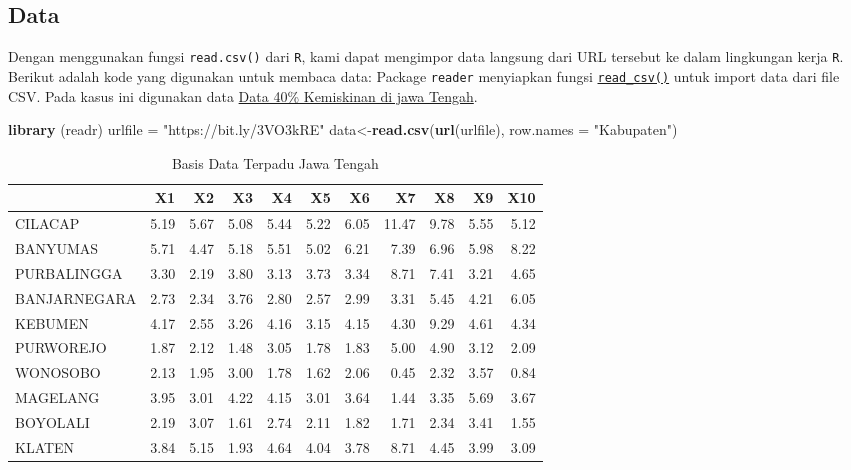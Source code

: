 \documentclass[
  oneside]{book}
\newenvironment{Shaded}{\begin{snugshade}}{\end{snugshade}}
\newcommand{\AttributeTok}[1]{\textcolor[rgb]{0.13,0.29,0.53}{#1}}
\newcommand{\FunctionTok}[1]{\textcolor[rgb]{0.13,0.29,0.53}{\textbf{#1}}}
\newcommand{\NormalTok}[1]{#1}
\newcommand{\OtherTok}[1]{\textcolor[rgb]{0.56,0.35,0.01}{#1}}
\newcommand{\StringTok}[1]{\textcolor[rgb]{0.31,0.60,0.02}{#1}}
\begin{document}
\subsection*{Data}\label{data}

Dengan menggunakan fungsi \texttt{read.csv()} dari \texttt{R}, kami dapat mengimpor data langsung dari URL tersebut ke dalam lingkungan kerja \texttt{R}. Berikut adalah kode yang digunakan untuk membaca data:
Package \texttt{reader} menyiapkan fungsi \href{https://readr.tidyverse.org/reference/read_delim.html}{\texttt{read\_csv()}} untuk import data dari file CSV. Pada kasus ini digunakan data \href{https://github.com/dedenistiawan/Dataset/blob/main/BDT.csv}{Data 40\% Kemiskinan di jawa Tengah}.

\begin{Shaded}
\begin{Highlighting}[]
\FunctionTok{library}\NormalTok{ (readr)}
\NormalTok{urlfile }\OtherTok{=} \StringTok{"https://bit.ly/3VO3kRE"}
\NormalTok{data}\OtherTok{\textless{}{-}}\FunctionTok{read.csv}\NormalTok{(}\FunctionTok{url}\NormalTok{(urlfile), }\AttributeTok{row.names =} \StringTok{"Kabupaten"}\NormalTok{)}
\end{Highlighting}
\end{Shaded}

\begin{table}

\caption{\label{tab:nice-tab-km}Basis Data Terpadu Jawa Tengah}
\centering
\begin{tabular}[t]{lrrrrrrrrrr}
\toprule
  & X1 & X2 & X3 & X4 & X5 & X6 & X7 & X8 & X9 & X10\\
\midrule
CILACAP & 5.19 & 5.67 & 5.08 & 5.44 & 5.22 & 6.05 & 11.47 & 9.78 & 5.55 & 5.12\\
BANYUMAS & 5.71 & 4.47 & 5.18 & 5.51 & 5.02 & 6.21 & 7.39 & 6.96 & 5.98 & 8.22\\
PURBALINGGA & 3.30 & 2.19 & 3.80 & 3.13 & 3.73 & 3.34 & 8.71 & 7.41 & 3.21 & 4.65\\
BANJARNEGARA & 2.73 & 2.34 & 3.76 & 2.80 & 2.57 & 2.99 & 3.31 & 5.45 & 4.21 & 6.05\\
KEBUMEN & 4.17 & 2.55 & 3.26 & 4.16 & 3.15 & 4.15 & 4.30 & 9.29 & 4.61 & 4.34\\
\addlinespace
PURWOREJO & 1.87 & 2.12 & 1.48 & 3.05 & 1.78 & 1.83 & 5.00 & 4.90 & 3.12 & 2.09\\
WONOSOBO & 2.13 & 1.95 & 3.00 & 1.78 & 1.62 & 2.06 & 0.45 & 2.32 & 3.57 & 0.84\\
MAGELANG & 3.95 & 3.01 & 4.22 & 4.15 & 3.01 & 3.64 & 1.44 & 3.35 & 5.69 & 3.67\\
BOYOLALI & 2.19 & 3.07 & 1.61 & 2.74 & 2.11 & 1.82 & 1.71 & 2.34 & 3.41 & 1.55\\
KLATEN & 3.84 & 5.15 & 1.93 & 4.64 & 4.04 & 3.78 & 8.71 & 4.45 & 3.99 & 3.09\\
\bottomrule
\end{tabular}
\end{table}
\end{document}
